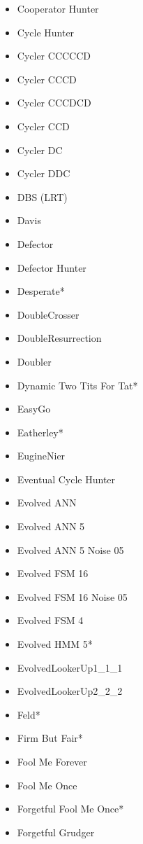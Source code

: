 \begin{appendices}
\begin{multicols}{4}
\begin{itemize}
            \item Cooperator Hunter
            \item Cycle Hunter
            \item Cycler CCCCCD
            \item Cycler CCCD
            \item Cycler CCCDCD
            \item Cycler CCD
            \item Cycler DC
            \item Cycler DDC
            \item DBS (LRT) 
            \item Davis
            \item Defector
            \item Defector Hunter
            \item Desperate*
            \item DoubleCrosser
            \item DoubleResurrection
            \item Doubler
            \item Dynamic Two Tits For Tat*
            \item EasyGo
            \item Eatherley*
            \item EugineNier
            \item Eventual Cycle Hunter
            \item Evolved ANN
            \item Evolved ANN 5
            \item Evolved ANN 5 Noise 05
            \item Evolved FSM 16
            \item Evolved FSM 16 Noise 05
            \item Evolved FSM 4
            \item Evolved HMM 5*
            \item EvolvedLookerUp1\_1\_1
            \item EvolvedLookerUp2\_2\_2
            \item Feld*
            \item Firm But Fair*
            \item Fool Me Forever
            \item Fool Me Once
            \item Forgetful Fool Me Once*
            \item Forgetful Grudger

\end{itemize}
\end{multicols}
\end{appendices}
